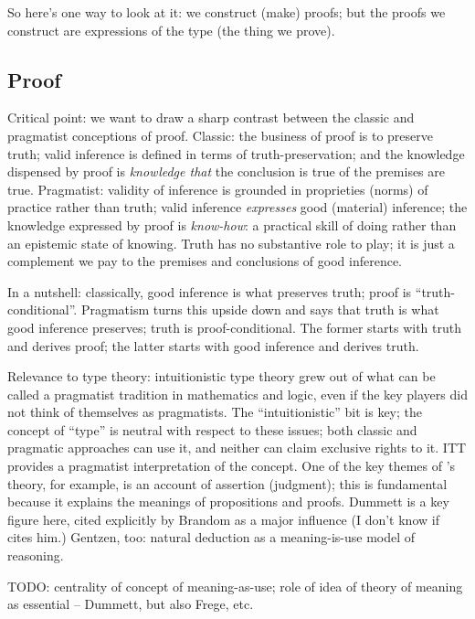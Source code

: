 So here's one way to look at it: we construct (make) proofs; but the
proofs we construct are expressions of the type (the thing we prove).

\subsection{Proof}
\label{subs:proof}

\begin{ednote}
  Critical point: we want to draw a sharp contrast between the classic
  and pragmatist conceptions of proof.  Classic: the business of proof
  is to preserve truth; valid inference is defined in terms of
  truth-preservation; and the knowledge dispensed by proof is
  \emph{knowledge that} the conclusion is true of the premises are
  true.  Pragmatist: validity of inference is grounded in proprieties
  (norms) of practice rather than truth; valid inference
  \emph{expresses} good (material) inference; the knowledge expressed
  by proof is \emph{know-how}: a practical skill of doing rather than
  an epistemic state of knowing.  Truth has no substantive role to
  play; it is just a complement we pay to the premises and conclusions
  of good inference.

  In a nutshell: classically, good inference is what preserves truth;
  proof is ``truth-conditional''.  Pragmatism turns this upside down
  and says that truth is what good inference preserves; truth is
  proof-conditional.  The former starts with truth and derives proof;
  the latter starts with good inference and derives truth.

  Relevance to type theory: intuitionistic type theory grew out of
  what can be called a pragmatist tradition in mathematics and logic,
  even if the key players did not think of themselves as pragmatists.
  The ``intuitionistic'' bit is key; the concept of ``type'' is
  neutral with respect to these issues; both classic and pragmatic
  approaches can use it, and neither can claim exclusive rights to it.
  ITT provides a pragmatist interpretation of the concept.  One of the
  key themes of \ML{}'s theory, for example, is an account of
  assertion (judgment); this is fundamental because it explains the
  meanings of propositions and proofs.  Dummett is a key figure here,
  cited explicitly by Brandom as a major influence (I don't know if
  \ML{} cites him.)  Gentzen, too: natural deduction as a
  meaning-is-use model of reasoning.

  TODO: centrality of concept of meaning-as-use; role of idea of
  theory of meaning as essential -- Dummett, but also Frege, etc.

\end{ednote}

